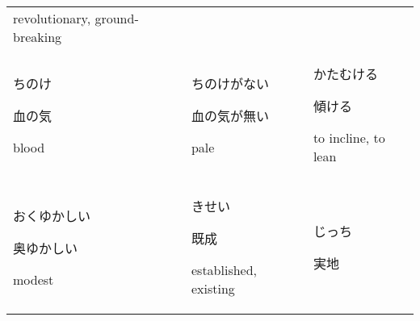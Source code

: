 \documentclass[12pt, a4j, landscape, dvipdfmx]{utarticle}
\begin{document}
\begin{minipage}[t][0pt]{\linewidth }
\begin{tabular}{||p{5.5cm}||p{5.5cm}||p{5.5cm}||}
            \rule{0pt}{3ex} \hspace*{.425cm} {\small
            revolutionary, ground-breaking}\tabularnewline
            \hhline{|:=::=::=:|} \rule{0pt}{3ex}
            \hspace*{-.4cm} {\LARGE ちのけ}\newline
            \rule{0pt}{3ex} \hspace*{.4cm} {\small
            血の気}\newline \rule{0pt}{3ex} \hspace*{.425cm}
            {\small blood}&\rule{0pt}{3ex} \hspace*{-.4cm}
            {\LARGE ちのけがない}\newline \rule{0pt}{3ex}
            \hspace*{.4cm} {\small 血の気が無い}\newline
            \rule{0pt}{3ex} \hspace*{.425cm} {\small
            pale}&\rule{0pt}{3ex} \hspace*{-.4cm} {\LARGE
            かたむける}\newline \rule{0pt}{3ex} \hspace*{.4cm}
            {\small 傾ける}\newline \rule{0pt}{3ex}
            \hspace*{.425cm} {\small
            to incline, to lean}\tabularnewline
            \hhline{|:=::=::=:|} \rule{0pt}{3ex}
            \hspace*{-.4cm} {\LARGE おくゆかしい}\newline
            \rule{0pt}{3ex} \hspace*{.4cm} {\small
            奥ゆかしい}\newline \rule{0pt}{3ex} \hspace*{.425cm}
            {\small modest}&\rule{0pt}{3ex} \hspace*{-.4cm}
            {\LARGE きせい}\newline \rule{0pt}{3ex}
            \hspace*{.4cm} {\small 既成}\newline
            \rule{0pt}{3ex} \hspace*{.425cm} {\small
            established, existing}&\rule{0pt}{3ex}
            \hspace*{-.4cm} {\LARGE じっち}\newline
            \rule{0pt}{3ex} \hspace*{.4cm} {\small
            実地}\newline \rule{0pt}{3ex} \hspace*{.425cm}

\end{tabular}
\end{minipage}
\end{document}

